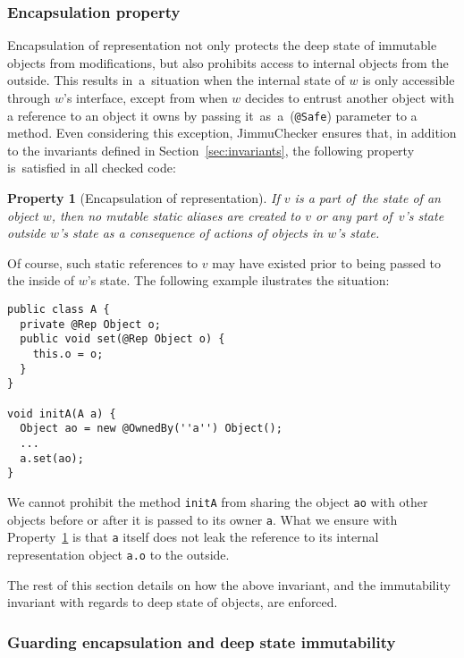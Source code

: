 \documentclass{pracamgr}
\theoremstyle{break}
\theoremstyle{break}
\newtheorem{invariant}{Property}
\theoremstyle{break}
\begin{document}
\subsubsection{Encapsulation property} 

Encapsulation of representation not only protects the deep state of
immutable objects from modifications, but also prohibits access to
internal objects from the outside. This results in~a~situation when
the internal state of $w$ is only accessible through $w$'s interface,
except from when $w$ decides to entrust another object with a
reference to an object it owns by passing it~as~a~(\texttt{@Safe})
parameter to a method. Even considering this exception, JimmuChecker
ensures that, in addition to the invariants defined in
Section~\ref{sec:invariants}, the following property is~satisfied in
all checked code:

\begin{invariant}[Encapsulation of representation] \label{inv:encap}
  If $v$ is a part of~the state of an object $w$, then no mutable
  static aliases are created to $v$ or any part of~$v$'s state outside
  $w$'s state as a consequence of actions of objects in $w$'s state.
\end{invariant}

Of course, such static references to $v$ may have existed prior to
being passed to the inside of $w$'s state. The following example
ilustrates the situation:

\begin{lstlisting}
public class A {
  private @Rep Object o;
  public void set(@Rep Object o) {
    this.o = o;
  }
}

void initA(A a) {
  Object ao = new @OwnedBy(''a'') Object();
  ...
  a.set(ao);
}
\end{lstlisting}

We cannot prohibit the method \texttt{initA} from sharing the object
\texttt{ao} with other objects before or after it is passed to its
owner \texttt{a}. What we ensure with Property~\ref{inv:encap} is that
\texttt{a} itself does not leak the reference to its internal
representation object \texttt{a.o} to the outside.

The rest of this section details on how the above invariant, and the
immutability invariant with regards to deep state of objects, are
enforced.

\subsubsection{Guarding encapsulation and deep state immutability} 
\end{document}
